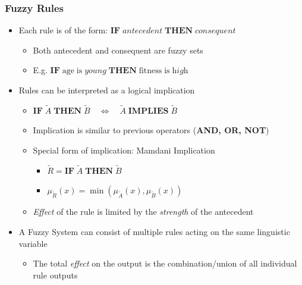\documentclass[
	10pt,
	t		%
]{beamer}
\begin{document}
\begin{frame}
	\frametitle{Fuzzy Rules}
	\begin{itemize}
		\item Each rule is of the form: $\textbf{IF} \; {antecedent} \; \textbf{THEN} \; {consequent}$
		      \begin{itemize}
			      \item Both antecedent and consequent are fuzzy sets
			      \item E.g. $\textbf{IF} \; \text{age} \; \text{is} \; \textit{young} \; \textbf{THEN} \; \text{fitness} \; \text{is} \; \textit{high}$
		      \end{itemize}
		\item Rules can be interpreted as a logical implication
		      \begin{itemize}
			      \item $\textbf{IF} \; \tilde{A} \; \textbf{THEN} \; \tilde{B} \quad \iff \quad \tilde{A} \;  \textbf{IMPLIES} \;  \tilde{B}$
			      \item Implication is similar to previous operators (\textbf{AND, OR, NOT})
			      \item Special form of implication: Mamdani Implication
			            \begin{itemize}
				            \item $\tilde{R} = \textbf{IF} \; \tilde{A} \; \textbf{THEN} \; \tilde{B}$
				            \item $\mu_{\tilde{R}}(x) = \min(\mu_{\tilde{A}}(x), \mu_{\tilde{B}}(x))$
			            \end{itemize}
			      \item \textit{Effect} of the rule is limited by the \textit{strength} of the antecedent
		      \end{itemize}
		\item A Fuzzy System can consist of multiple rules acting on the same linguistic variable
		      \begin{itemize}
			      \item The total \textit{effect} on the output is the combination/union of all individual rule outputs
		      \end{itemize}
	\end{itemize}
\end{frame}
\end{document}
